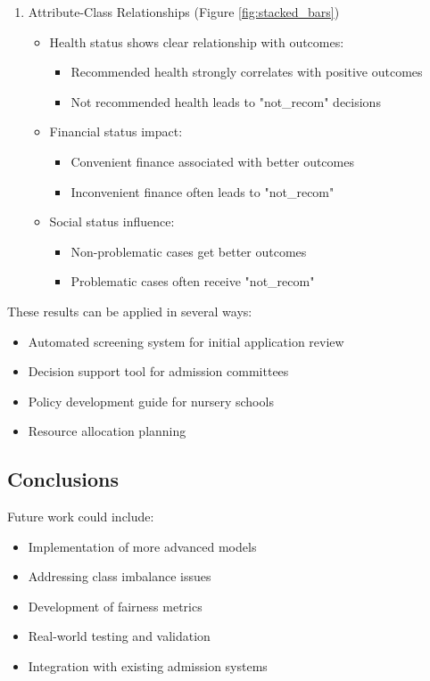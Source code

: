 \begin{enumerate}
    \item Attribute-Class Relationships (Figure \ref{fig:stacked_bars})
    \begin{itemize}
        \item Health status shows clear relationship with outcomes:
            \begin{itemize}
                \item Recommended health strongly correlates with positive outcomes
                \item Not recommended health leads to "not\_recom" decisions
            \end{itemize}
        \item Financial status impact:
            \begin{itemize}
                \item Convenient finance associated with better outcomes
                \item Inconvenient finance often leads to "not\_recom"
            \end{itemize}
        \item Social status influence:
            \begin{itemize}
                \item Non-problematic cases get better outcomes
                \item Problematic cases often receive "not\_recom"
            \end{itemize}
    \end{itemize}
\end{enumerate}

These results can be applied in several ways:
\begin{itemize}
    \item Automated screening system for initial application review
    \item Decision support tool for admission committees
    \item Policy development guide for nursery schools
    \item Resource allocation planning
\end{itemize}

\subsection{Conclusions}
Future work could include:
\begin{itemize}
    \item Implementation of more advanced models
    \item Addressing class imbalance issues
    \item Development of fairness metrics
    \item Real-world testing and validation
    \item Integration with existing admission systems
\end{itemize}

